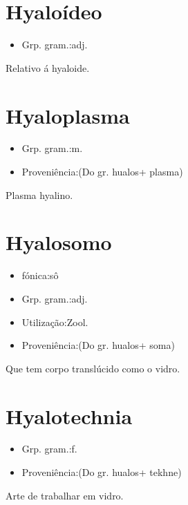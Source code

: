 \documentclass{article}
\begin{document}
\section{Hyaloídeo}
\begin{itemize}
\item {Grp. gram.:adj.}
\end{itemize}
Relativo á hyaloide.
\section{Hyaloplasma}
\begin{itemize}
\item {Grp. gram.:m.}
\end{itemize}
\begin{itemize}
\item {Proveniência:(Do gr. \textunderscore hualos\textunderscore  + \textunderscore plasma\textunderscore )}
\end{itemize}
Plasma hyalino.
\section{Hyalosomo}
\begin{itemize}
\item {fónica:sô}
\end{itemize}
\begin{itemize}
\item {Grp. gram.:adj.}
\end{itemize}
\begin{itemize}
\item {Utilização:Zool.}
\end{itemize}
\begin{itemize}
\item {Proveniência:(Do gr. \textunderscore hualos\textunderscore  + \textunderscore soma\textunderscore )}
\end{itemize}
Que tem corpo translúcido como o vidro.
\section{Hyalotechnia}
\begin{itemize}
\item {Grp. gram.:f.}
\end{itemize}
\begin{itemize}
\item {Proveniência:(Do gr. \textunderscore hualos\textunderscore  + \textunderscore tekhne\textunderscore )}
\end{itemize}
Arte de trabalhar em vidro.
\end{document}
